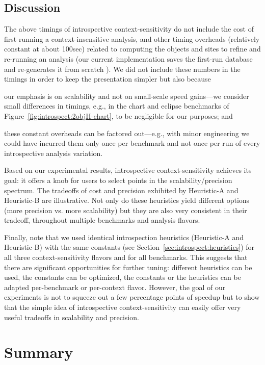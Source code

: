 \subsection{Discussion}
The above timings of introspective context-sensitivity do not include the cost of first running a context-insensitive analysis, and other timing overheads (relatively constant at about 100sec) related to computing the objects and sites to refine and re-running an analysis (our current implementation saves the first-run database and re-generates it from scratch \todo{}). We did not include these numbers in the timings in order to keep the presentation simpler but also because
\begin{inparaenum}[(a)]
\item our emphasis is on scalability and not on small-scale speed gains---we consider small differences in timings, e.g., in the chart and eclipse benchmarks of Figure~\ref{fig:introspect:2objH-chart}, to be negligible for our purposes; and
\item these constant overheads can be factored out---e.g., with minor engineering we could have incurred them only once per benchmark and not once per run of every introspective analysis variation.
\end{inparaenum}

Based on our experimental results, introspective context-sensitivity achieves its goal: it offers a knob for users to select points in the scalability/precision spectrum. The tradeoffs of cost and precision exhibited by Heuristic-A and Heuristic-B are illustrative. Not only do these heuristics yield different options (more precision vs. more scalability) but they are also very consistent in their tradeoff, throughout multiple benchmarks and analysis flavors.

Finally, note that we used identical introspection heuristics (Heuristic-A and Heuristic-B) with the same constants (see Section~\ref{sec:introspect:heuristics}) for all three context-sensitivity flavors and for all benchmarks. This suggests that there are significant opportunities for further tuning: different heuristics can be used, the constants can be optimized, the constants or the heuristics can be adapted per-benchmark or per-context flavor. However, the goal of our experiments is not to squeeze out a few percentage points of speedup but to show that the simple idea of introspective context-sensitivity can easily offer very useful tradeoffs in scalability and precision.


\section{Summary}

